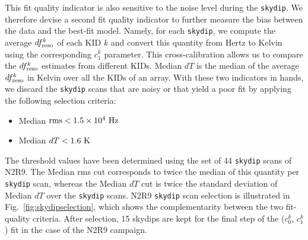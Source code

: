 %
This fit quality indicator is also sensitive to the noise
level during the {\tt skydip}. We therefore devise a second fit quality
indicator to further measure the bias between the data and the
best-fit model.
Namely, for each {\tt skydip}, we compute the average
$df_{\rm{reso}}^k$ of each KID $k$ and convert this quantity from Hertz to Kelvin
using the corresponding $c_1^k$ parameter. This cross-calibration
allows us to compare the $df_{\rm{reso}}^k$ estimates from different KIDs.
Median $dT$ is the median of the average $df_{\rm{reso}}^k$ in Kelvin over all the KIDs of an
array. With these two indicators in hands, we discard the {\tt skydip} scans
that are noisy or that yield a poor fit by applying the following selection
criteria:

\begin{itemize}
\item Median $\rm{rms} < 1.5 \times 10^{4}~\rm{Hz}$
\item Median $dT < 1.6~\rm{K}$
\end{itemize}

The threshold values have been determined using the set of 44 {\tt skydip}
scans of N2R9. The Median rms cut corresponds to twice the median of
this quantity per {\tt skydip} scan, whereas the Median $dT$ cut is twice
the standard deviation of Median $dT$ over the {\tt skydip} scans.
N2R9 {\tt skydip} scan selection is illustrated in
{\lp Fig.~\ref{fig:skydipselection},
which shows the complementarity between the two fit-quality
criteria. After selection, 15 skydips are kept for the final step of
the ($c_0^k$, $c_1^k$) fit in the case of the N2R9 campaign.}


